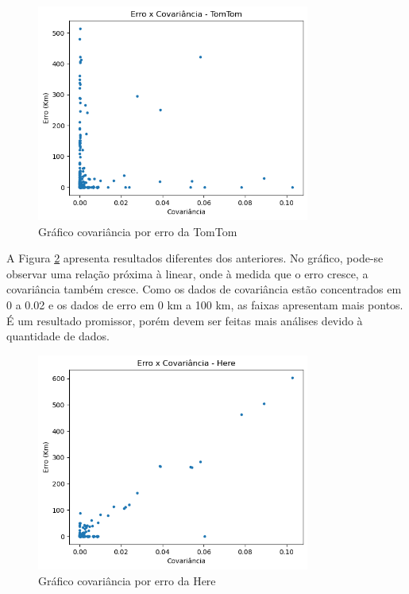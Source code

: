 \begin{figure}[h]
  \centering
  \includegraphics[width=0.8\textwidth]{Figuras/ErroCovT.png}
  \caption{Gráfico covariância por erro da TomTom}
  \label{fig:CovErroT}
\end{figure}

A Figura \ref{fig:CovErroH} apresenta resultados diferentes dos anteriores. No gráfico, pode-se observar uma relação próxima à linear, onde à medida que o erro cresce, a covariância também cresce. Como os dados de covariância estão concentrados em 0 a 0.02 e os dados de erro em 0 km a 100 km, as faixas apresentam mais pontos. É um resultado promissor, porém devem ser feitas mais análises devido à quantidade de dados.


\begin{figure}[h]
  \centering
  \includegraphics[width=0.8\textwidth]{Figuras/ErroCovH.png}
  \caption{Gráfico covariância por erro da Here}
  \label{fig:CovErroH}
\end{figure}
